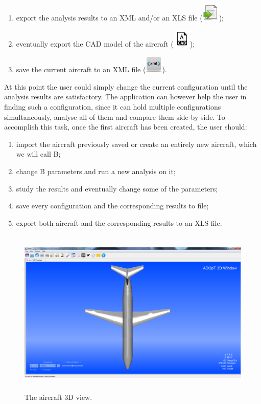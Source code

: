 \begin{enumerate}
	\item export the analysis results to an XML and/or an XLS file \big(\includegraphics[scale=0.4]{Immagini/gui/icons/Export_32x32.png}\big);
	
	\item eventually export the CAD model of the aircraft \big(\includegraphics[scale=1.2]{Immagini/gui/icons/cad_32x32.png}\big);
	\item save the current aircraft to an XML file \big(\includegraphics[scale=0.4]{Immagini/gui/icons/XML_32x32.png}\big).
\end{enumerate}

	
At this point the user could simply change the current configuration until the analysis results are satisfactory. The application can however help the user in finding such a configuration, since it can hold multiple configurations simultaneously, analyse all of them and compare them side by side. To accomplish this task, once the first aircraft has been created, the user should:

\begin{enumerate}
	\item import the aircraft previously saved or create an entirely new aircraft, which we will call B;
	\item change B parameters and run a new analysis on it;
	\item study the results and eventually change some of the parameters;
	\item save every configuration and the corresponding results to file;
	\item export both aircraft and the corresponding results to an XLS file.
\end{enumerate}
	
	\begin{figure}[H]
	\centering
		\includegraphics[height =8cm]{Immagini/gui/cad3.png}
		\caption{The aircraft 3D view.}
	\end{figure}		
%

